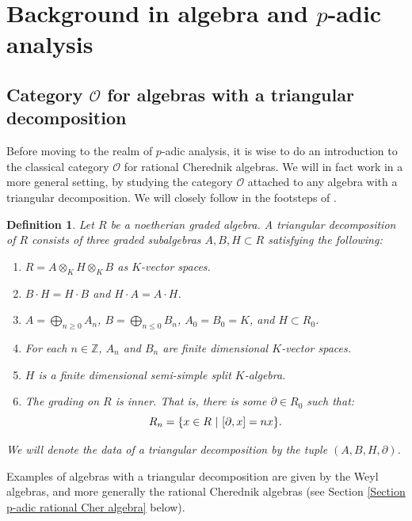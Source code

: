 \documentclass{amsart}
\newtheorem{defi}{ Definition}[subsection]
\newcommand{\OX}{\mathcal{O}}
\begin{document}
\section{\texorpdfstring{Background in algebra and $p$-adic analysis}{}}
\subsection{\texorpdfstring{Category $\OX$ for algebras with a triangular decomposition}{}}\label{Section category O over p-adic fields}
Before moving to the realm of $p$-adic analysis, it is wise to do an introduction to the classical category $\OX$ for rational Cherednik algebras. We will in fact work in a more general setting, by studying the category $\OX$ attached to any algebra with a triangular decomposition. We will closely follow in the footsteps of \cite{ginzburg2003category}. 
\begin{defi}\label{defi triangular decomposition}
Let $R$ be a noetherian graded algebra. A triangular decomposition of $R$ consists of three graded subalgebras $A,B,H\subset R$ satisfying the following:
\begin{enumerate}[label=(\roman*)]
    \item $R=A\otimes_KH\otimes_KB$ as $K$-vector spaces.
    \item $B\cdot  H=H\cdot B$ and $H\cdot A=A\cdot H$.
    \item $A=\bigoplus_{n\geq 0}A_n$, $B=\bigoplus_{n\leq 0}B_n$, $A_0=B_0=K$, and $H\subset R_0$. 
    \item For each $n\in\mathbb{Z}$, $A_n$ and $B_n$ are finite dimensional $K$-vector spaces.
    \item $H$ is a finite dimensional semi-simple split $K$-algebra.
    \item The grading on $R$ is inner. That is, there is some $\partial\in R_0$ such that:
    \begin{equation*}
        R_n=\{ x\in R \textnormal{ }\vert \textnormal{ } [\partial,x]=nx   \}.
    \end{equation*}
\end{enumerate}
We will denote the data of a triangular decomposition by the tuple $(A,B,H,\partial)$.
\end{defi}
Examples of algebras with a triangular decomposition are given by the Weyl algebras, and more generally the rational Cherednik algebras (see Section \ref{Section p-adic rational Cher algebra} below). 
\end{document}
